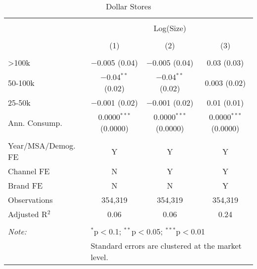 
\begin{table}[!htbp] \centering 
  \caption{Dollar Stores} 
  \label{tab:packageSizeDollarSoda} 
\begin{tabular}{@{\extracolsep{5pt}}lccc} 
\\[-1.8ex]\hline 
\hline \\[-1.8ex] 
 & \multicolumn{3}{c}{Log(Size)} \\ 
\\[-1.8ex] & (1) & (2) & (3)\\ 
\hline \\[-1.8ex] 
 >100k & $-$0.005 (0.04) & $-$0.005 (0.04) & 0.03 (0.03) \\ 
  50-100k & $-$0.04$^{**}$ (0.02) & $-$0.04$^{**}$ (0.02) & 0.003 (0.02) \\ 
  25-50k & $-$0.001 (0.02) & $-$0.001 (0.02) & 0.01 (0.01) \\ 
  Ann. Consump. & 0.0000$^{***}$ (0.0000) & 0.0000$^{***}$ (0.0000) & 0.0000$^{***}$ (0.0000) \\ 
 \hline \\[-1.8ex] 
Year/MSA/Demog. FE & Y & Y & Y \\ 
Channel FE & N & Y & Y \\ 
Brand FE & N & N & Y \\ 
Observations & 354,319 & 354,319 & 354,319 \\ 
Adjusted R$^{2}$ & 0.06 & 0.06 & 0.24 \\ 
\hline 
\hline \\[-1.8ex] 
\textit{Note:}  & \multicolumn{3}{l}{$^{*}$p$<$0.1; $^{**}$p$<$0.05; $^{***}$p$<$0.01} \\ 
 & \multicolumn{3}{l}{Standard errors are clustered at the market level.} \\ 
\end{tabular} 
\end{table} 
